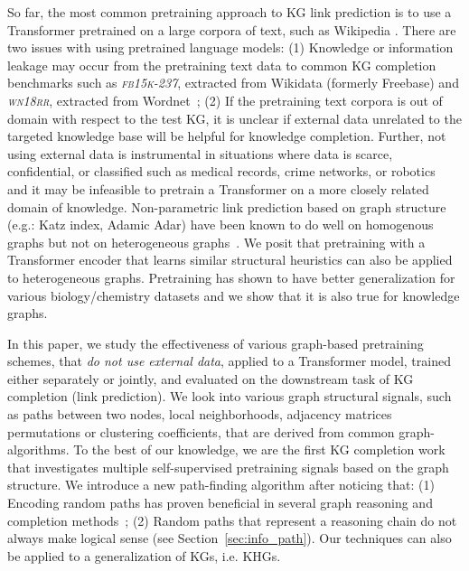 \documentclass{article}
\newcommand{\wnrr}{\textsl{\textsc{wn18rr}}\xspace}
\newcommand{\fb}{\textsl{\textsc{fb15k-237}}\xspace}
\begin{document}
So far, the most common pretraining approach to KG link prediction is to use a Transformer pretrained on a large corpora of text, such as Wikipedia \cite{Yao2019KGBERTBF,star2021,lpbert2022}.
There are two issues with using pretrained language models:
(1) Knowledge or information leakage may occur from the pretraining text data to common KG completion benchmarks such as \fb \cite{freebase}, extracted from Wikidata (formerly Freebase) and \wnrr \cite{wn18rr}, extracted from Wordnet~\cite{miller-1994-wordnet};
(2) If the pretraining text corpora is out of domain with respect to the test KG, it is unclear if external data unrelated to the targeted knowledge base will be helpful for knowledge completion.
Further, not using external data is instrumental in situations where data is scarce, confidential, or classified such as medical records, crime networks, or robotics~\cite{Wang2019/07} and it may be infeasible to pretrain a Transformer on a more closely related domain of knowledge.
Non-parametric link prediction based on graph structure (e.g.: Katz index, Adamic Adar) have been known to do well on homogenous graphs but not on heterogeneous graphs~\cite{path_link_pred_2020}. 
We posit that pretraining with a Transformer encoder that learns similar structural heuristics can also be applied to heterogeneous graphs. 
Pretraining has shown to have better generalization for various biology/chemistry datasets \cite{Hu2020Strategies} and we show that it is also true for knowledge graphs.

In this paper, we study the effectiveness of various graph-based pretraining schemes, that \emph{do not use external data}, applied to a Transformer model, trained either separately or jointly, and evaluated on the downstream task of KG completion (link prediction).
We look into various graph structural signals, such as paths between two nodes, local neighborhoods, adjacency matrices permutations or clustering coefficients, that are derived from common graph-algorithms.
To the best of our knowledge, we are the first KG completion work that investigates multiple self-supervised pretraining signals based on the graph structure.
We introduce a new path-finding algorithm after noticing that:
(1) Encoding random paths has proven beneficial in several graph reasoning and completion methods~\cite{Mazumder2017ContextawarePR,pmlr-v77-jiang17a,wang-etal-2020-connecting,xu-etal-2021-p-int};
(2) Random paths that represent a reasoning chain do not always make logical sense (see Section~\ref{sec:info_path}).
Our techniques can also be applied to a generalization of KGs, i.e. KHGs.
\end{document}
